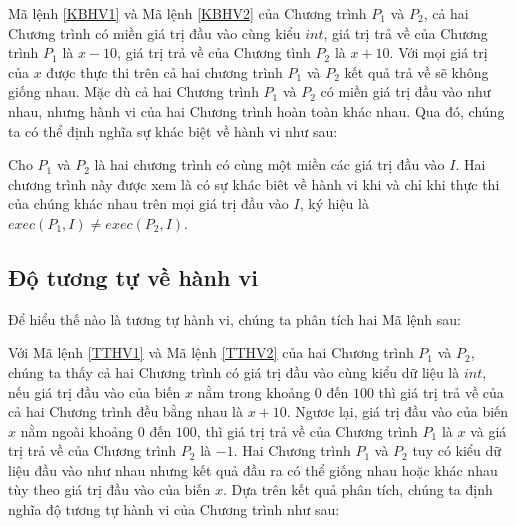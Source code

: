 Mã lệnh \ref{KBHV1} và Mã lệnh \ref{KBHV2}  của Chương trình $P_{1}$ và $P_{2}$, cả hai Chương trình có miền giá trị đầu vào cùng kiểu $int$, giá trị trả về của Chương trình $P_{1}$ là $x - 10$, giá trị trả về của Chương tình $P_{2}$ là $x + 10$. Với mọi giá trị của $x$ được thực thi trên cả hai chương trình $P_{1}$ và $P_{2}$ kết quả trả về sẽ không giống nhau. Mặc dù cả hai Chương trình $P_{1}$ và $P_{2}$ có miền giá trị đầu vào như nhau, nhưng hành vi của hai Chương trình hoàn toàn khác nhau. Qua đó, chúng ta có thể định nghĩa sự khác biệt về hành vi như sau:

\begin{definition}
Cho $P_{1}$ và $P_{2}$ là hai chương trình có cùng một miền các giá trị đầu vào $I$. Hai chương trình này được xem là có sự khác biêt về hành vi khi và chỉ khi thực thi của chúng khác nhau trên mọi giá trị đầu vào $I$, ký hiệu là $exec(P_{1}, I) \neq exec(P_{2}, I)$.
\end{definition}

\subsection{Độ tương tự về hành vi}
Để hiểu thế nào là tương tự hành vi, chúng ta phân tích hai Mã lệnh sau:

\begin{minipage}[t]{0.45\linewidth}
	
\end{minipage}%
\hfill\vrule\hfill
\begin{minipage}[t]{0.45\linewidth}
	
\end{minipage}%

Với Mã lệnh \ref{TTHV1} và Mã lệnh \ref{TTHV2} của hai Chương trình $P_{1}$ và $P_{2}$, chúng ta thấy cả hai Chương trình có giá trị đầu vào cùng kiểu dữ liệu là $int$, nếu giá trị đầu vào của biến $x$ nằm trong khoảng $0$ đến $100$ thì giá trị trả về của cả hai Chương trình đều bằng nhau là $x+10$. Ngươc lại, giá trị đầu vào của biến $x$ nằm ngoài khoảng $0$ đến $100$, thì giá trị trả về của Chương trình $P_{1}$ là $x$ và giá trị trả về của Chương trình $P_{2}$ là $-1$. Hai Chương trình $P_{1}$ và $P_{2}$ tuy có kiểu dữ liệu đầu vào như nhau nhưng kết quả đầu ra có thể giống nhau hoặc khác nhau tùy theo giá trị đầu vào của biến $x$. Dựa trên kết quả phân tích, chúng ta định nghĩa độ tương tự hành vi của Chương trình như sau:

